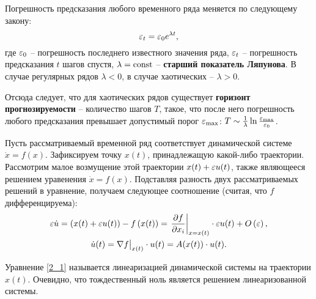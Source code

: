 
Погрешность предсказания любого временного ряда меняется по следующему закону:
\begin{equation*}
    \varepsilon_t = \varepsilon_0 e^{\lambda t},
\end{equation*}
где $\varepsilon_0$ -- погрешность последнего известного значения ряда, $\varepsilon_t$ -- погрешность предсказания $t$ шагов спустя, $\lambda = \mathrm{const}$ -- \textbf{старший показатель Ляпунова}. В случае регулярных рядов $\lambda < 0$, в случае хаотических -- $\lambda > 0$.

Отсюда следует, что для хаотических рядов существует \textbf{горизонт прогнозируемости} -- количество шагов $T$, такое, что после него погрешность любого предсказания превышает допустимый порог $\varepsilon_{\text{max}}$: $T \sim \frac{1}{\lambda} \ln \frac{\varepsilon_{\text{max}}}{\varepsilon_0}$.



Пусть рассматриваемый временной ряд соответствует динамической системе $\dot{x} = f(x)$.
Зафиксируем точку $x(t)$, принадлежащую какой-либо траектории. Рассмотрим малое возмущение этой траектории $x(t) + \varepsilon u(t)$, также являющееся решением уравенения $\dot{x} = f(x)$.
Подставляя разность двух рассматриваемых решений в уравнение, получаем следующее соотношение (считая, что $f$ дифференцируема):
\begin{gather}
\nonumber
    \varepsilon \dot{u} = 
    \left( x(t) + \varepsilon u(t) \right) - f\left( x(t) \right) =
    \left. \frac{\partial f}{\partial x_i} \right|_{x=x(t)} \cdot \varepsilon u(t) + O\left( \varepsilon \right), \\
\label{2_1}
    \dot{u}(t) = \nabla f \big|_{x(t)} \cdot u(t) = A(x(t)) \cdot u(t).
\end{gather}

Уравнение \eqref{2_1} называется линеаризацией динамической системы на траектории $x(t)$.
Очевидно, что тождественный ноль является решением линеаризованной системы.

